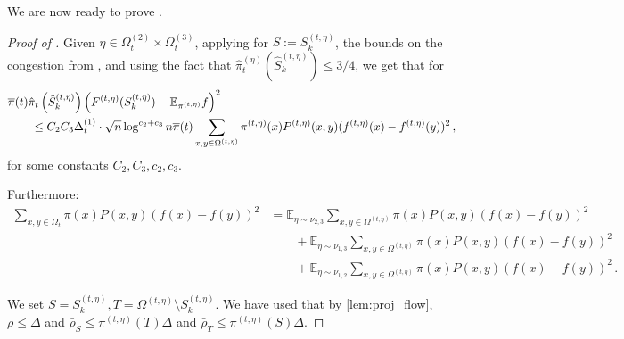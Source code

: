 \documentclass[a4paper, 12p]{article}
\numberwithin{equation}{section}
\newcommand{\Exp}{\mathbb{E}}
\newcommand{\FF}{F}
\newcommand{\piproj}{\overline{\pi}}
\newcommand{\piorproj}{\hat{\pi}}
\begin{document}
We are now ready to prove .

\begin{proof}[Proof of ]
Given $\eta \in \Omega_t^{(2)} \times \Omega_t^{(3)}$, applying  for $S := S_k^{(t, \eta)}$, the bounds on the congestion from , and using the fact that $\hat{\pi}_t^{(\eta)}(\hat S_k^{(t,\eta)})\leq 3/4$, we get that for 
\begin{align}
&\piproj(t)\piorproj_t\left(\hat S_k^{(t,\eta)}\right)\left(\FF^{(t,\eta)}(S_k^{(t,\eta)}) - \Exp_{\pi^{(t,\eta)}} f\right)^2 \notag 
    \\
    &\qquad\leq C_2C_3 \Delta_t^{(1)}\cdot \sqrt n \log^{c_2+c_3} n\piproj(t)\sum_{x, y \in \Omega^{(t,\eta)}} \pi^{(t,\eta)}(x)P^{(t,\eta)}(x, y)(f^{(t,\eta)}(x) - f^{(t,\eta)}(y))^2\,,\label{eqn:trixport}
\end{align}
for some constants $C_2, C_3, c_2, c_3$.

Furthermore:
\begin{align}
    \sum_{x,y \in \Omega_t}\pi(x)P(x,y)(f(x)-f(y))^2 &= \Exp_{\eta \sim \nu_{2,3}}\sum_{x,y\in\Omega^{(t,\eta)}}\pi(x)P(x,y)(f(x)-f(y))^2 \nonumber \\
    &\qquad + \Exp_{\eta \sim \nu_{1,3}}\sum_{x,y\in\Omega^{(t,\eta)}}\pi(x)P(x,y)(f(x)-f(y))^2 \nonumber \\
    &\qquad + \Exp_{\eta \sim \nu_{1,2}}\sum_{x,y\in\Omega^{(t,\eta)}}\pi(x)P(x,y)(f(x)-f(y))^2\,.
    \label{eqn:etatofull}
\end{align}

We set $S = S_k^{(t,\eta)}, T = \Omega^{(t,\eta)} \setminus S_k^{(t,\eta)}$. We have used that by \cref{lem:proj_flow}, $\rho \leq \Delta$ and $\bar \rho_S \leq \pi^{(t,\eta)}(T)\Delta$ and $\bar \rho_T \leq \pi^{(t,\eta)}(S)\Delta$.


\end{proof}
\end{document}
